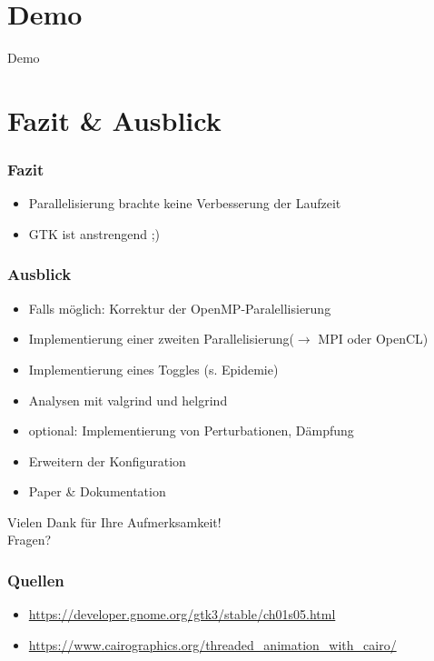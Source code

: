 \documentclass[xcolor=dvipsnames]{beamer}
\begin{document}
\section{Demo}
\begin{frame}
	\centering
	\textcolor{htwgreen}{{\LARGE Demo}}
\end{frame}

\section{Fazit \& Ausblick}
\frame{\tableofcontents[current]}

\begin{frame}\frametitle{Fazit}
	\begin{itemize}
		\item Parallelisierung brachte keine Verbesserung der Laufzeit
		\item GTK ist anstrengend ;)
	\end{itemize}
\end{frame}

\begin{frame}\frametitle{Ausblick}
	\begin{itemize}
		\item Falls möglich: Korrektur der OpenMP-Paralellisierung
		\item Implementierung einer zweiten Parallelisierung\newline($\rightarrow$ MPI oder OpenCL)
		\item Implementierung eines Toggles (s. Epidemie)
		\item Analysen mit valgrind und helgrind
		\item optional: Implementierung von Perturbationen, Dämpfung
		\item Erweitern der Konfiguration
		\item Paper \& Dokumentation
	\end{itemize}
\end{frame}

\begin{frame}
	\centering
	\textcolor{htwgreen}{{\LARGE Vielen Dank für Ihre Aufmerksamkeit!\\[6ex] Fragen?}}
\end{frame}

\begin{frame}\frametitle{Quellen}
	\footnotesize
	\begin{itemize}
		\item \url{https://developer.gnome.org/gtk3/stable/ch01s05.html}
		\item \url{https://www.cairographics.org/threaded_animation_with_cairo/}
	\end{itemize}
\end{frame}
\end{document}
